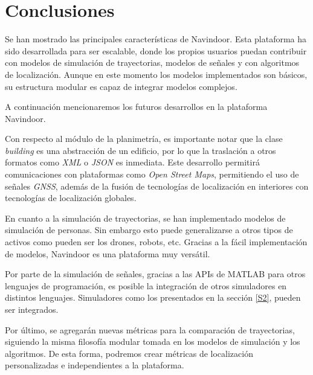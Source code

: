 \section{Conclusiones}\label{S5}

Se han mostrado las principales características de Navindoor.  Esta plataforma ha sido desarrollada para ser escalable, donde los propios usuarios puedan contribuir con modelos de simulación de trayectorias, modelos de señales y con algoritmos de localización. Aunque en este momento los modelos implementados son básicos, su estructura modular es capaz de integrar modelos complejos.
%  

A continuación mencionaremos los futuros desarrollos en la plataforma Navindoor.

Con respecto al módulo de la planimetría, es importante notar que la clase \emph{building} es una abstracción de un edificio, por lo que la traslación a otros formatos como \emph{XML} o \emph{JSON} es inmediata. Este desarrollo permitirá comunicaciones con plataformas como \emph{Open Street Maps}, permitiendo el uso de señales \emph{GNSS}, además de la fusión de tecnologías de localización en interiores con tecnologías de localización globales.
%

En cuanto a la simulación de trayectorias, se han implementado modelos de simulación de personas. Sin embargo esto puede generalizarse a otros tipos de activos como pueden ser los drones, robots, etc. Gracias a la fácil implementación de modelos, Navindoor es una plataforma muy versátil.

Por parte de la simulación de señales, gracias a las APIs de MATLAB para otros lenguajes de programación, es posible la integración de otros simuladores en distintos lenguajes. Simuladores como los presentados en la sección \ref{S2}, pueden ser integrados.

% 
Por último, se agregarán nuevas métricas para la comparación de trayectorias, siguiendo la misma filosofía modular tomada en los modelos de simulación y los algoritmos. De esta forma, podremos crear métricas de localización personalizadas e independientes a la plataforma.

% 

